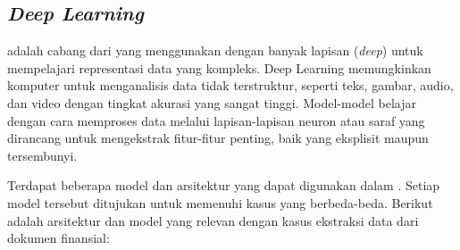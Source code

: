 \subsection{\emph{Deep Learning}}
\label{subsec:dl}

\dlfl{} adalah cabang dari \ml{} yang menggunakan \annfull{} dengan banyak lapisan (\emph{deep}) untuk mempelajari representasi data yang kompleks. Deep Learning memungkinkan komputer untuk menganalisis data tidak terstruktur, seperti teks, gambar, audio, dan video dengan tingkat akurasi yang sangat tinggi. Model-model \dl{} belajar dengan cara memproses data melalui lapisan-lapisan neuron atau saraf yang dirancang untuk mengekstrak fitur-fitur penting, baik yang eksplisit maupun tersembunyi. \parencite{Goodfellow-et-al-2016}

Terdapat beberapa model dan arsitektur yang dapat digunakan dalam \dl. Setiap model tersebut ditujukan untuk memenuhi kasus yang berbeda-beda. Berikut adalah arsitektur dan model yang relevan dengan kasus ekstraksi data dari dokumen finansial:


